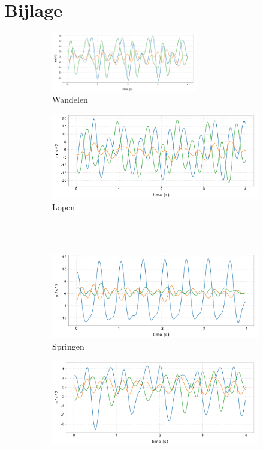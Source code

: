 \documentclass{article}
\begin{document}
\section{Bijlage}
\begin{figure}[hb!]
\centering

  \begin{subfigure}[b]{.49\linewidth}
    \centering
    \includegraphics[width=0.70\textwidth]{figures/wandelen}
    \caption{Wandelen}\label{fig:1a}
  \end{subfigure}%
  \begin{subfigure}[b]{.49\linewidth}
    \centering
    \includegraphics[width=.70\textwidth]{figures/lopen}
    \caption{Lopen}\label{fig:1b}
  \end{subfigure} \\~\\
  \begin{subfigure}[b]{.49\linewidth}
    \centering
    \includegraphics[width=.70\textwidth]{figures/springen}
    \caption{Springen}\label{fig:1c}
  \end{subfigure}
  \begin{subfigure}[b]{.49\linewidth}
    \centering
    \includegraphics[width=.70\textwidth]{figures/fietsen}

\end{subfigure}
\end{figure}
\end{document}
